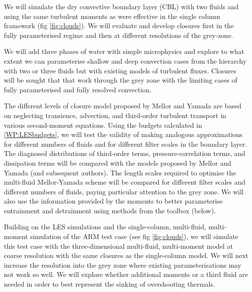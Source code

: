 \documentclass[11pt,a4paper]{article}
\begin{document}
We will simulate the dry convective boundary layer (CBL) with two fluids and using the same turbulent moments as were effective in the single column framework (fig \ref{fig:clouds}). We will evaluate and develop closures first in the fully parameterised regime and then at different resolutions of the grey-zone.


We will add three phases of water with simple microphysics and explore to what extent we can parameterise shallow and deep convection cases from the hierarchy with two or three fluids but with existing models of turbulent fluxes. Closures will be sought that that work through the grey zone with the limiting cases of fully parameterised and fully resolved convection.


The different levels of closure model proposed by Mellor and Yamada are based on neglecting transience, advection, and third-order turbulent transport in various second-moment equations. Using the budgets calculated in \ref{WP:LESbudgets}, we will test the validity of making analogous approximations for different numbers of fluids and for different filter scales in the boundary layer. The diagnosed distributions of third-order terms, pressure-correlation terms, and dissipation terms will be compared with the models proposed by Mellor and Yamada (and subsequent authors). The length scales required to optimise the multi-fluid Mellor-Yamada scheme will be compared for different filter scales and different numbers of fluids, paying particular attention to the grey zone. We will also use the information provided by the moments to better parameterise entrainment and detrainment using methods from the toolbox (below).


Building on the LES simulations and the single-column, multi-fluid, multi-moment simulation of the ARM test case (see fig \ref{fig:clouds}), we will simulate this test case with the three-dimensional multi-fluid, multi-moment model at coarse resolution with the same closures as the single-column model.  We will next increase the resolution into the grey zone where existing parameterisations may not work so well. We will explore whether additional moments or a third fluid are needed in order to best represent the sinking of overshooting thermals. 
\end{document}
